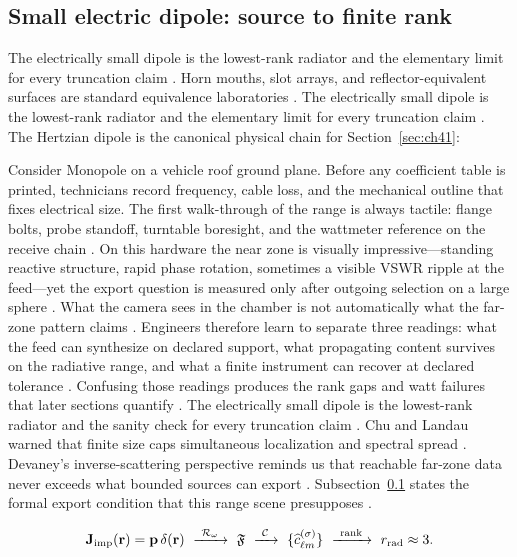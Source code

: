 \subsection{Small electric dipole: source to finite rank}
\label{sec:ch41.signature-dipole}
The electrically small dipole is the lowest-rank radiator and the elementary limit for every truncation claim \cite{jackson1999}.
Horn mouths, slot arrays, and reflector-equivalent surfaces are standard equivalence laboratories \cite{collin2001}.
The electrically small dipole is the lowest-rank radiator and the elementary limit for every truncation claim \cite{jackson1999}.
The Hertzian dipole is the canonical physical chain for Section~\ref{sec:ch41}:
\begin{physicalvignette}
Consider Monopole on a vehicle roof ground plane. Before any coefficient table is printed, technicians record frequency, cable loss, and the mechanical outline that fixes electrical size. The first walk-through of the range is always tactile: flange bolts, probe standoff, turntable boresight, and the wattmeter reference on the receive chain \cite{hansen1988}.
On this hardware the near zone is visually impressive---standing reactive structure, rapid phase rotation, sometimes a visible VSWR ripple at the feed---yet the export question is measured only after outgoing selection on a large sphere \cite{harrington2001}. What the camera sees in the chamber is not automatically what the far-zone pattern claims \cite{stratton1941}.
Engineers therefore learn to separate three readings: what the feed can synthesize on declared support, what propagating content survives on the radiative range, and what a finite instrument can recover at declared tolerance \cite{devaney2004}. Confusing those readings produces the rank gaps and watt failures that later sections quantify \cite{pal2026}.
The electrically small dipole is the lowest-rank radiator and the sanity check for every truncation claim . 
Chu and Landau warned that finite size caps simultaneous localization and spectral spread \cite{chu1948}. Devaney's inverse-scattering perspective reminds us that reachable far-zone data never exceeds what bounded sources can export \cite{devaney2004}.
Subsection~\ref{sec:ch41.signature-dipole} states the formal export condition that this range scene presupposes \cite{stratton1941}.
\end{physicalvignette}
\begin{equation}
\label{eq:ch4.signature-dipole-chain}
\mathbf{J}_{\mathrm{imp}}(\mathbf{r})=\mathbf{p}\,\delta(\mathbf{r})
\ \xrightarrow{\ \mathcal{R}_\omega\ }\
\mathfrak{F}
\ \xrightarrow{\ \mathcal{C}\ }\
\{\widehat{c}_{\ell m}^{(\sigma)}\}
\ \xrightarrow{\ \text{rank}\ }\
r_{\mathrm{rad}}\approx 3.
\end{equation}
